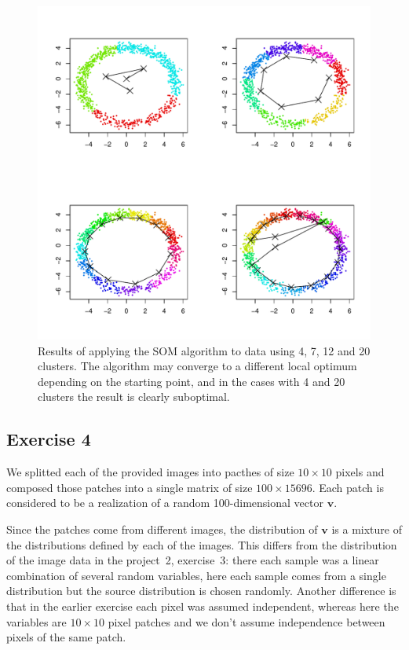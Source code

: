 \documentclass{article}
\renewcommand\vec[1]{\ensuremath{\mathbf{#1}}}
\begin{document}
\begin{figure}\centering
	\includegraphics[width=\columnwidth]{som}
	\caption{Results of applying the SOM algorithm to data using 4, 7, 12 and 20 clusters. The algorithm may converge to a different local optimum depending on the starting point, and in the cases with 4 and 20 clusters the result is clearly suboptimal.}\label{fig:som}
\end{figure}

\subsection{Exercise 4}
We splitted each of the provided images into pacthes of size $10\times10$ pixels and composed those patches into a single matrix of size $100\times 15696$.
Each patch is considered to be a realization of a random 100-dimensional vector \vec v.

Since the patches come from different images, the distribution of \vec v is a mixture of the distributions defined by each of the images.
This differs from the distribution of the image data in the project~2, exercise~3: there each sample was a linear combination of several random variables, here each sample comes from a single distribution but the source distribution is chosen randomly.
Another difference is that in the earlier exercise each pixel was assumed independent, whereas here the variables are $10\times 10$ pixel patches and we don't assume independence between pixels of the same patch.
\end{document}
